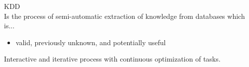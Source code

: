 \begin{definition}{KDD}\\
Is the process of semi-automatic extraction of knowledge from databases which is...
\begin{itemize}
    \item valid, previously unknown, and potentially useful
\end{itemize}
Interactive and iterative process with continuous optimization of tasks.
\end{definition}





